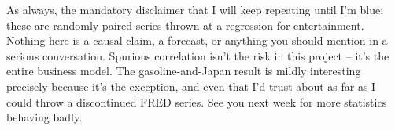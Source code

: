 As always, the mandatory disclaimer that I will keep repeating until I'm blue: these are randomly paired series thrown at a regression for entertainment. Nothing here is a causal claim, a forecast, or anything you should mention in a serious conversation. Spurious correlation isn't the risk in this project -- it's the entire business model. The gasoline-and-Japan result is mildly interesting precisely because it's the exception, and even that I'd trust about as far as I could throw a discontinued FRED series. See you next week for more statistics behaving badly.
